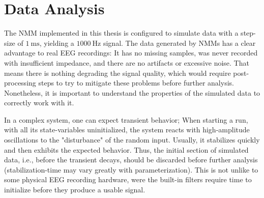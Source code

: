 
\section{Data Analysis}\label{sec:data-analysis}
The NMM implemented in this thesis is configured to simulate data with a step-size of $\SI{1}{\milli\second}$,
yielding a $\SI{1000}{\hertz}$ signal.
The data generated by NMMs has a clear advantage to real EEG recordings:
It has no missing samples,
was never recorded with insufficient impedance,
and there are no artifacts or excessive noise.
That means there is nothing degrading the signal quality,
which would require post-processing steps to try to mitigate these problems
before further analysis.
Nonetheless, it is important to understand the properties of the simulated data to correctly work with it.

In a complex system, one can expect transient behavior;
When starting a run, with all its state-variables uninitialized,
the system reacts with high-amplitude oscillations to the "disturbance" of the random input.
Usually, it stabilizes quickly and then exhibits the expected behavior.
Thus, the initial section of simulated data,
i.e., before the transient decays,
should be discarded before further analysis (stabilization-time may vary greatly with parameterization).
This is not unlike to some physical EEG recording hardware,
were the built-in filters require time to initialize before they produce a usable signal.

